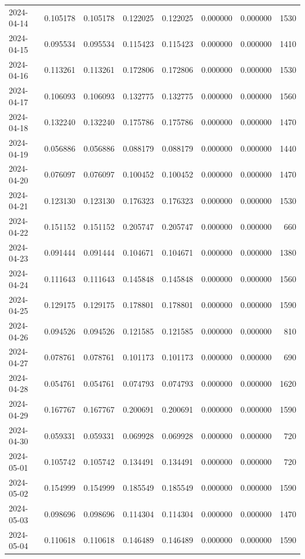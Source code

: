 \begin{tabular}{lrrrrrrr}
2024-04-14 & 0.105178 & 0.105178 & 0.122025 & 0.122025 & 0.000000 & 0.000000 & 1530 \\
2024-04-15 & 0.095534 & 0.095534 & 0.115423 & 0.115423 & 0.000000 & 0.000000 & 1410 \\
2024-04-16 & 0.113261 & 0.113261 & 0.172806 & 0.172806 & 0.000000 & 0.000000 & 1530 \\
2024-04-17 & 0.106093 & 0.106093 & 0.132775 & 0.132775 & 0.000000 & 0.000000 & 1560 \\
2024-04-18 & 0.132240 & 0.132240 & 0.175786 & 0.175786 & 0.000000 & 0.000000 & 1470 \\
2024-04-19 & 0.056886 & 0.056886 & 0.088179 & 0.088179 & 0.000000 & 0.000000 & 1440 \\
2024-04-20 & 0.076097 & 0.076097 & 0.100452 & 0.100452 & 0.000000 & 0.000000 & 1470 \\
2024-04-21 & 0.123130 & 0.123130 & 0.176323 & 0.176323 & 0.000000 & 0.000000 & 1530 \\
2024-04-22 & 0.151152 & 0.151152 & 0.205747 & 0.205747 & 0.000000 & 0.000000 & 660 \\
2024-04-23 & 0.091444 & 0.091444 & 0.104671 & 0.104671 & 0.000000 & 0.000000 & 1380 \\
2024-04-24 & 0.111643 & 0.111643 & 0.145848 & 0.145848 & 0.000000 & 0.000000 & 1560 \\
2024-04-25 & 0.129175 & 0.129175 & 0.178801 & 0.178801 & 0.000000 & 0.000000 & 1590 \\
2024-04-26 & 0.094526 & 0.094526 & 0.121585 & 0.121585 & 0.000000 & 0.000000 & 810 \\
2024-04-27 & 0.078761 & 0.078761 & 0.101173 & 0.101173 & 0.000000 & 0.000000 & 690 \\
2024-04-28 & 0.054761 & 0.054761 & 0.074793 & 0.074793 & 0.000000 & 0.000000 & 1620 \\
2024-04-29 & 0.167767 & 0.167767 & 0.200691 & 0.200691 & 0.000000 & 0.000000 & 1590 \\
2024-04-30 & 0.059331 & 0.059331 & 0.069928 & 0.069928 & 0.000000 & 0.000000 & 720 \\
2024-05-01 & 0.105742 & 0.105742 & 0.134491 & 0.134491 & 0.000000 & 0.000000 & 720 \\
2024-05-02 & 0.154999 & 0.154999 & 0.185549 & 0.185549 & 0.000000 & 0.000000 & 1590 \\
2024-05-03 & 0.098696 & 0.098696 & 0.114304 & 0.114304 & 0.000000 & 0.000000 & 1470 \\
2024-05-04 & 0.110618 & 0.110618 & 0.146489 & 0.146489 & 0.000000 & 0.000000 & 1590 \\

\end{tabular}
